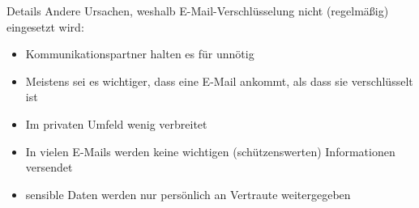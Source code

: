 \documentclass[]{beamer}
\begin{document}
\begin{frame}{Details}
	Andere Ursachen, weshalb E-Mail-Verschlüsselung nicht (regelmäßig) eingesetzt wird:
	\begin{itemize}[<+->]
	  \item Kommunikationspartner halten es für unnötig
	  \item Meistens sei es wichtiger, dass eine E-Mail ankommt, als dass sie verschlüsselt ist
	  \item Im privaten Umfeld wenig verbreitet
	  \item In vielen E-Mails werden keine wichtigen (schützenswerten) Informationen versendet
	  \item sensible Daten werden nur persönlich an Vertraute weitergegeben
	\end{itemize}
	
\end{frame}
\end{document}
